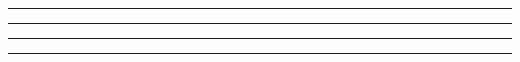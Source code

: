 
\begin{problem}{14.4}

\end{problem}

\begin{solution}


\end{solution}

\noindent\rule{7in}{1.5pt}


\begin{problem}{14.5}

\end{problem}

\begin{solution}


\end{solution}

\noindent\rule{7in}{1.5pt}


\begin{problem}{14.6}

\end{problem}

\begin{solution}


\end{solution}

\noindent\rule{7in}{1.5pt}


\begin{problem}{14.7}

\end{problem}

\begin{solution}


\end{solution}

\noindent\rule{7in}{1.5pt}


